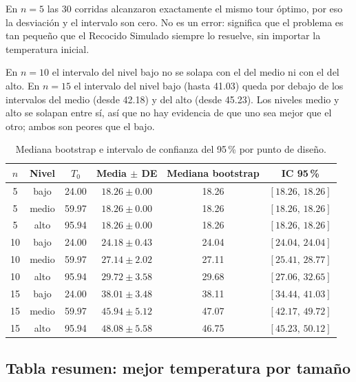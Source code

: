 \documentclass[11pt,letterpaper]{article}
\begin{document}
En $n = 5$ las 30 corridas alcanzaron exactamente el mismo tour óptimo, por
eso la desviación y el intervalo son cero. No es un error: significa que el
problema es tan pequeño que el Recocido Simulado siempre lo resuelve, sin
importar la temperatura inicial.

En $n = 10$ el intervalo del nivel bajo no se solapa con el del medio ni con
el del alto. En $n = 15$ el intervalo del nivel bajo (hasta 41.03) queda por
debajo de los intervalos del medio (desde 42.18) y del alto (desde 45.23).
Los niveles medio y alto se solapan entre sí, así que no hay evidencia de que
uno sea mejor que el otro; ambos son peores que el bajo.

\begin{table}[H]
  \centering
  \caption{Mediana bootstrap e intervalo de confianza del 95\,\% por punto de
  diseño.}
  \label{tab:bootstrap}
  \small
  \setlength{\tabcolsep}{5pt}
  \renewcommand{\arraystretch}{1.15}
  \begin{tabular}{@{}cccccc@{}}
    \toprule
    $n$ & Nivel & $T_0$ & Media $\pm$ DE & Mediana bootstrap & IC 95\,\% \\
    \midrule
    5  & bajo  & 24.00 & $18.26 \pm 0.00$ & 18.26 & $[18.26,\, 18.26]$ \\
    5  & medio & 59.97 & $18.26 \pm 0.00$ & 18.26 & $[18.26,\, 18.26]$ \\
    5  & alto  & 95.94 & $18.26 \pm 0.00$ & 18.26 & $[18.26,\, 18.26]$ \\
    10 & bajo  & 24.00 & $24.18 \pm 0.43$ & 24.04 & $[24.04,\, 24.04]$ \\
    10 & medio & 59.97 & $27.14 \pm 2.02$ & 27.11 & $[25.41,\, 28.77]$ \\
    10 & alto  & 95.94 & $29.72 \pm 3.58$ & 29.68 & $[27.06,\, 32.65]$ \\
    15 & bajo  & 24.00 & $38.01 \pm 3.48$ & 38.11 & $[34.44,\, 41.03]$ \\
    15 & medio & 59.97 & $45.94 \pm 5.12$ & 47.07 & $[42.17,\, 49.72]$ \\
    15 & alto  & 95.94 & $48.08 \pm 5.58$ & 46.75 & $[45.23,\, 50.12]$ \\
    \bottomrule
  \end{tabular}
\end{table}

\subsection{Tabla resumen: mejor temperatura por tamaño}
\end{document}
